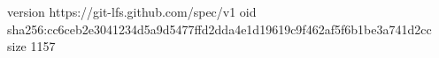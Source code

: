 version https://git-lfs.github.com/spec/v1
oid sha256:cc6ceb2e3041234d5a9d5477ffd2dda4e1d19619c9f462af5f6b1be3a741d2cc
size 1157
